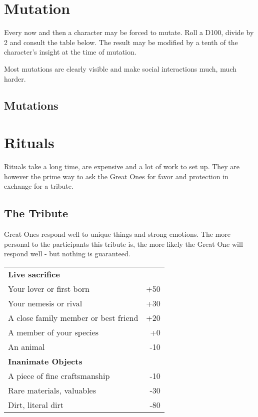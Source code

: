\documentclass[11pt,a4paper,openany]{book}
\begin{document}
	\chapter{Mutation}
	\label{ch:mutation}
	Every now and then a character may be forced to mutate.
	Roll a D100, divide by 2 and consult the table below.
	The result may be modified by a tenth of the character's insight at the time of mutation.
	\begin{exampleblock}
		Most mutations are clearly visible and make social interactions much, much harder.
	\end{exampleblock}
	\begin{multicols}{2}
		\begin{enumerate}
			\setlength\itemsep{-10mm}
		\end{enumerate}
	\end{multicols}
	
	\section*{Mutations}
	\vspace{4mm}
	\begin{multicols}{2}
	\end{multicols}
	
	\chapter{Rituals}
	\label{ch:rituals}
	Rituals take a long time, are expensive and a lot of work to set up. They are however the prime way to ask the Great Ones for favor and protection in exchange for a tribute.
	\section{The Tribute}
	Great Ones respond well to unique things and strong emotions. The more personal to the participants this tribute is, the more likely the Great One will respond well - but nothing is guaranteed.
	\par
	\begin{center}
	\begin{tabular}{lr}
		\textbf{Live sacrifice} & \\
		Your lover or first born & +50 \\
		Your nemesis or rival & +30 \\
		A close family member or best friend & +20 \\
		A member of your species & +0 \\
		An animal & -10 \\
		\hline
		\textbf{Inanimate Objects} & \\
		A piece of fine craftsmanship & -10 \\
		Rare materials, valuables & -30 \\
		Dirt, literal dirt & -80
	\end{tabular}
	\end{center}
\end{document}
